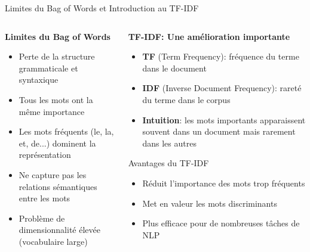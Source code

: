 \documentclass[aspectratio=169,11pt]{beamer}
\begin{document}
\begin{frame}{Limites du Bag of Words et Introduction au TF-IDF}
    \begin{columns}
        \begin{column}{0.5\textwidth}
            \textbf{Limites du Bag of Words}
            \begin{itemize}
                \item Perte de la structure grammaticale et syntaxique
                \item Tous les mots ont la même importance
                \item Les mots fréquents (le, la, et, de...) dominent la représentation
                \item Ne capture pas les relations sémantiques entre les mots
                \item Problème de dimensionnalité élevée (vocabulaire large)
            \end{itemize}
        \end{column}
        
        \begin{column}{0.5\textwidth}
            \textbf{TF-IDF: Une amélioration importante}
            \begin{itemize}
                \item \textbf{TF} (Term Frequency): fréquence du terme dans le document
                \item \textbf{IDF} (Inverse Document Frequency): rareté du terme dans le corpus
                \item \textbf{Intuition}: les mots importants apparaissent souvent dans un document mais rarement dans les autres
            \end{itemize}
            \vspace{0.2cm}
            \begin{alertblock}{Avantages du TF-IDF}
                \begin{itemize}
                    \item Réduit l'importance des mots trop fréquents
                    \item Met en valeur les mots discriminants
                    \item Plus efficace pour de nombreuses tâches de NLP
                \end{itemize}
            \end{alertblock}
        \end{column}
    \end{columns}
\end{frame}
\end{document}
